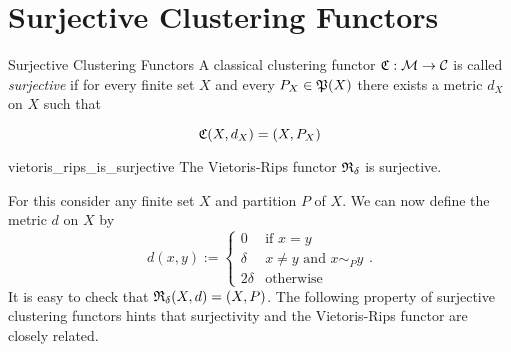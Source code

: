 



\section{Surjective Clustering Functors}

\begin{definition}{Surjective Clustering Functors \source}{}
    A classical clustering functor $\Cf: \M \to \C$ is called \emph{surjective} if for every finite set $X$ and every $P_X \in \P(X)$ there exists a metric $d_X$ on $X$ such that

    \begin{equation*}
        \Cf(X,d_X) = (X,P_X)
    \end{equation*}

\end{definition}

\begin{myremark}{}{vietoris_rips_is_surjective}
    The Vietoris-Rips functor $\Rf_\delta$ is surjective.
\end{myremark}
For this consider any finite set $X$ and partition $P$ of $X$. We can now define the metric $d$ on $X$ by
\begin{equation*}
    d(x,y) := \begin{cases}
        0 & \text{if } x = y\\
        \delta & x \neq y \text{ and } x \sim_P y\\
        2\delta & \text{otherwise}
    \end{cases}.
\end{equation*}
It is easy to check that $\Rf_\delta(X,d) = (X,P)$.
The following property of surjective clustering functors hints that surjectivity and the Vietoris-Rips functor are closely related.

